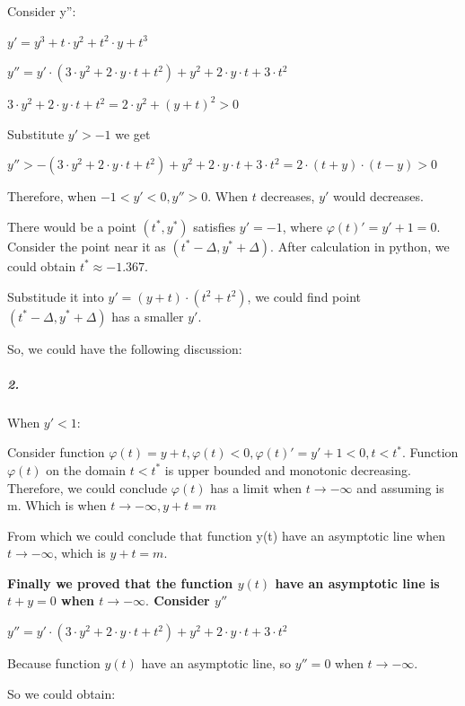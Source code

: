 \documentclass[11pt,a4paper]{article}
\begin{document}
	Consider y'':
	
	\begin{center}
		$y' = y^3+t\cdot y^2+t^2\cdot y+t^3$
		
		$y''=y'\cdot (3\cdot y^2+2\cdot y\cdot t+t^2)+y^2+2\cdot y\cdot t + 3\cdot t^2$
		
		$3\cdot y^2+2\cdot y \cdot t + t^2=2\cdot y^2+(y+t)^2>0$
	\end{center}

	Substitute $y'>-1$ we get
	
	\begin{center}
		$y''> -(3\cdot y^2+2\cdot y \cdot t + t^2)+y^2+2\cdot y \cdot t + 3\cdot t^2 = 2 \cdot (t+y)\cdot (t-y)>0$
	\end{center}

	Therefore, when $-1<y'<0, y'' > 0$. When $t$ decreases, $y'$ would decreases. 
	
	There would be a point $(t^*, y^*)$ satisfies $y'=-1$, where $\varphi(t)'=y'+1=0$. Consider the point near it as $(t^*-\Delta, y^*+\Delta)$. After calculation in python, we could obtain $t^* \approx -1.367$.
	
	Substitude it into $y'=(y+t)\cdot(t^2+t^2)$, we could find point $(t^*-\Delta, y^*+\Delta)$ has a smaller $y'$.
	
	So, we could have the following discussion:
	
	\subparagraph{2.} When $y' < 1$:
	
	Consider function $\varphi(t)=y+t, \varphi(t)<0, \varphi(t)'=y'+1<0, t<t^*$.
	Function $\varphi(t)$ on the domain $t<t^*$ is upper bounded and monotonic decreasing. Therefore, we could conclude $\varphi(t)$ has a limit when $t \rightarrow -\infty$ and assuming is m.
	Which is when $t \rightarrow -\infty, y+t=m$
	
	From which we could conclude that function y(t) have an asymptotic line when $t\rightarrow -\infty$, which is $y+t=m$.
	
	\textbf{Finally we proved that the function $y(t)$ have an asymptotic line is $t+y=0$ when $t\rightarrow -\infty.$ Consider $y''$}
	
	\begin{center}
		$y''=y'\cdot(3\cdot y^2+2\cdot y \cdot t+t^2)+y^2+2\cdot y \cdot t + 3\cdot t^2$
	\end{center}
	
	Because function $y(t)$ have an asymptotic line, so $y''=0$ when $t\rightarrow -\infty$.
	
	So we could obtain:
	
\end{document}
